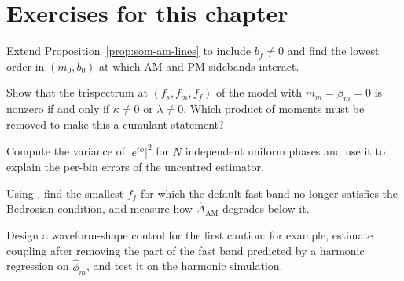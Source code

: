\section*{Exercises for this chapter}
\begin{exercise}
Extend Proposition~\ref{prop:som-am-lines} to include $b_f\ne0$ and find
the lowest order in $(m_0,b_0)$ at which AM and PM sidebands interact.
\end{exercise}
\begin{exercise}
Show that the trispectrum at $(f_s,f_m,f_f)$ of the model with
$m_m=\beta_m=0$ is nonzero if and only if $\kappa\ne0$ or $\lambda\ne0$.
Which product of moments must be removed to make this a cumulant
statement?
\end{exercise}
\begin{exercise}
Compute the variance of $\lvert\overline{e^{i\phi}}\rvert^2$ for $N$
independent uniform phases and use it to explain the per-bin errors of the
uncentred estimator.
\end{exercise}
\begin{exercise}
Using , find the smallest $f_f$ for which
the default fast band no longer satisfies the Bedrosian condition, and
measure how $\hat\Delta_{\mathrm{AM}}$ degrades below it.
\end{exercise}
\begin{exercise}
Design a waveform-shape control for the first caution: for example,
estimate coupling after removing the part of the fast band predicted by a
harmonic regression on $\hat\phi_m$, and test it on the harmonic
simulation.
\end{exercise}
